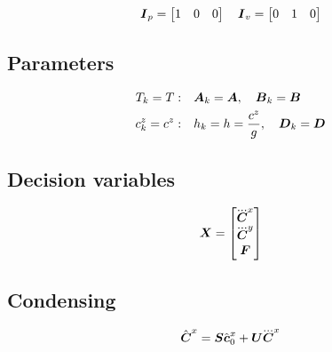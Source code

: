 \begin{equation*}
\mbox{\boldmath $I$}_{p} = \begin{bmatrix} 1 & 0 & 0 \end{bmatrix}
\quad
\mbox{\boldmath $I$}_{v} = \begin{bmatrix} 0 & 1 & 0 \end{bmatrix}
\end{equation*}


\subsection{Parameters}
\begin{align*}
T_k = T:&
\quad
\mbox{\boldmath $A$}_k = \mbox{\boldmath $A$},
\quad
\mbox{\boldmath $B$}_k = \mbox{\boldmath $B$}\\
c^z_k = c^z:& 
\quad
h_k = h = \frac{c^z}{g},
\quad
\mbox{\boldmath $D$}_k = \mbox{\boldmath $D$}
\end{align*}


\subsection{Decision variables}
\begin{equation*}
\V{X} = 
\begin{bmatrix} 
    \cJerk^x \\ 
    \cJerk^y \\ 
    \FD
\end{bmatrix}
\end{equation*}



\subsection{Condensing}

\begin{equation*}
\cState^x = \M{S} \cstate_0^x     +   \M{U} \cJerk^x
\end{equation*}

